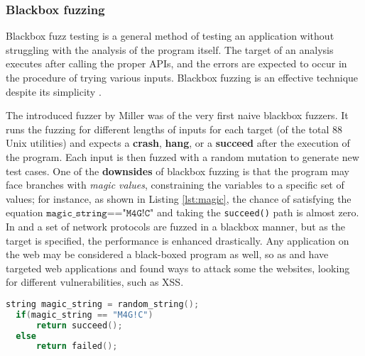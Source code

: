 \subsubsection{Blackbox fuzzing}

Blackbox fuzz testing is a general method of testing an application without struggling with the analysis of the program itself. The target of an analysis executes after calling the proper APIs, and the errors are expected to occur in the procedure of trying various inputs. Blackbox fuzzing is an effective technique despite its simplicity \cite{woo2013scheduling}.

The introduced fuzzer by Miller \cite{miller1990empirical} was of the very first naive blackbox fuzzers. It runs the fuzzing for different lengths of inputs for each target (of the total 88 Unix utilities) and expects a \textbf{crash}, \textbf{hang}, or a \textbf{succeed} after the execution of the program. Each input is then fuzzed with a random mutation to generate new test cases. One of the \textbf{downsides} of blackbox fuzzing is that the program may face branches with \textit{magic values}, constraining the variables to a specific set of values; for instance, as shown in Listing \ref{lst:magic}, the chance of satisfying the equation $\texttt{magic\_string=="M4G!C"}$ and taking the \texttt{succeed()} path is almost zero. In \cite{banks2006snooze} and \cite{gascon2015pulsar} a set of network protocols are fuzzed in a blackbox manner, but as the target is specified, the performance is enhanced drastically. Any application on the web may be considered a black-boxed program as well, so as \cite{doupe2012enemy} and \cite{duchene2012xss} have targeted web applications and found ways to attack some the websites, looking for different vulnerabilities, such as XSS.

\begin{lstlisting}[language=C++,style=CodeStyle,caption=Magic Value: \texttt{M4G!C} is a magic value,label={lst:magic}]
  string magic_string = random_string();
  if(magic_string == "M4G!C")
      return succeed();
  else
      return failed();
\end{lstlisting}

